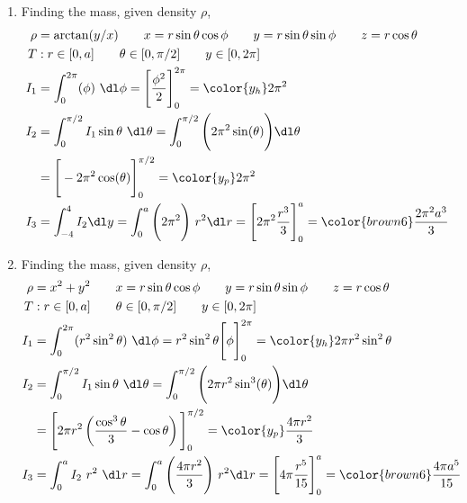 \begin{enumerate}
     \item Finding the mass, given density $ \rho $,
           \begin{align}
                \rho & = \arctan(y/x) \qquad x = r\sin \theta \cos \phi
                \qquad y = r\sin \theta \sin \phi \qquad z = r \cos \theta              \\
                T    & : r \in [0, a] \qquad \theta \in [0, \pi/2]
                \qquad y \in [0, 2\pi]                                                  \\
                I_1  & = \int_{0}^{2\pi} (\phi)
                \ \dl \phi
                = \Bigg[ \frac{\phi^2}{2} \Bigg]_{0}^{2\pi}
                = {\color{y_h} 2\pi^2}                                                  \\
                I_2  & = \int_{0}^{\pi/2}I_1 \sin \theta\ \dl \theta = \int_{0}^{\pi/2}
                \Bigg( 2\pi^2 \sin(\theta) \Bigg) \dl \theta                            \\
                     & = \Bigg[  -2\pi^2 \cos(\theta) \Bigg]_{0}^{\pi/2}
                = {\color{y_p} 2\pi^2 }                                                 \\
                I_3  & = \int_{-4}^{4} I_2 \dl y = \int_{0}^{a}
                \Bigg( 2\pi^2 \Bigg)\ r^2 \dl r
                = \Bigg[ 2\pi^2 \frac{r^3}{3} \Bigg]_{0}^{a}
                = {\color{brown6} \frac{2\pi^2a^3}{3}}
           \end{align}

     \item Finding the mass, given density $ \rho $,
           \begin{align}
                \rho & = x^2 + y^2 \qquad x = r\sin \theta \cos \phi
                \qquad y = r\sin \theta \sin \phi \qquad z = r \cos \theta              \\
                T    & : r \in [0, a] \qquad \theta \in [0, \pi/2]
                \qquad y \in [0, 2\pi]                                                  \\
                I_1  & = \int_{0}^{2\pi} (r^2 \sin^2 \theta)
                \ \dl \phi
                = r^2 \sin^2 \theta \Bigg[ \phi \Bigg]_{0}^{2\pi}
                = {\color{y_h} 2\pi r^2 \sin^2 \theta}                                  \\
                I_2  & = \int_{0}^{\pi/2}I_1 \sin \theta\ \dl \theta = \int_{0}^{\pi/2}
                \Bigg( 2\pi r^2 \sin^3(\theta) \Bigg) \dl \theta                        \\
                     & = \Bigg[ 2\pi r^2 \left( \frac{\cos^3 \theta}{3}
                     - \cos \theta \right) \Bigg]_{0}^{\pi/2}
                = {\color{y_p} \frac{4\pi r^2}{3} }                                     \\
                I_3  & = \int_{0}^{a} I_2\ r^2\ \dl r = \int_{0}^{a}
                \Bigg( \frac{4\pi r^2}{3} \Bigg)\ r^2 \dl r
                = \Bigg[ 4\pi \frac{r^5}{15} \Bigg]_{0}^{a}
                = {\color{brown6} \frac{4\pi a^5}{15}}
           \end{align}


\end{enumerate}
